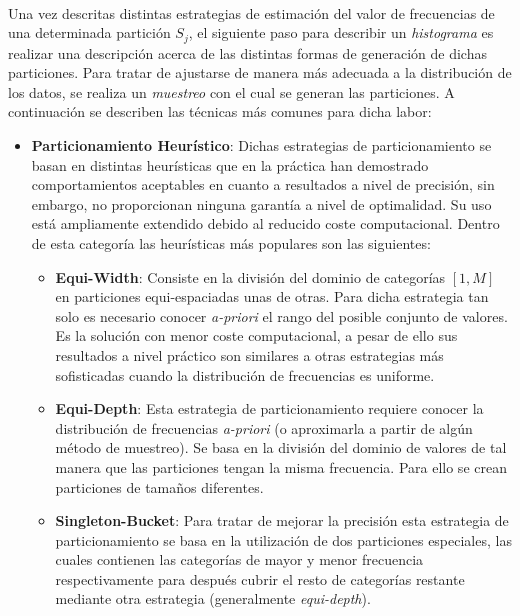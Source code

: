 \documentclass{subfiles}
\begin{document}
        \paragraph{}
        Una vez descritas distintas estrategias de estimación del valor de frecuencias de una determinada partición $S_j$, el siguiente paso para describir un \emph{histograma} es realizar una descripción acerca de las distintas formas de generación de dichas particiones. Para tratar de ajustarse de manera más adecuada a la distribución de los datos, se realiza un \emph{muestreo} con el cual se generan las particiones. A continuación se describen las técnicas más comunes para dicha labor:

        \begin{itemize}

          \item \textbf{Particionamiento Heurístico}: Dichas estrategias de particionamiento se basan en distintas heurísticas que en la práctica han demostrado comportamientos aceptables en cuanto a resultados a nivel de precisión, sin embargo, no proporcionan ninguna garantía a nivel de optimalidad. Su uso está ampliamente extendido debido al reducido coste computacional. Dentro de esta categoría las heurísticas más populares son las siguientes:
            \begin{itemize}

              \item \textbf{Equi-Width}: Consiste en la división del dominio de categorías $[1,M]$ en particiones equi-espaciadas unas de otras. Para dicha estrategia tan solo es necesario conocer \emph{a-priori} el rango del posible conjunto de valores. Es la solución con menor coste computacional, a pesar de ello sus resultados a nivel práctico son similares a otras estrategias más sofisticadas cuando la distribución de frecuencias es uniforme.

              \item \textbf{Equi-Depth}: Esta estrategia de particionamiento requiere conocer la distribución de frecuencias \emph{a-priori} (o aproximarla a partir de algún método de muestreo). Se basa en la división del dominio de valores de tal manera que las particiones tengan la misma frecuencia. Para ello se crean particiones de tamaños diferentes.

              \item \textbf{Singleton-Bucket}: Para tratar de mejorar la precisión esta estrategia de particionamiento se basa en la utilización de dos particiones especiales, las cuales contienen las categorías de mayor y menor frecuencia respectivamente para después cubrir el resto de categorías restante mediante otra estrategia (generalmente \emph{equi-depth}).


\end{itemize}
\end{itemize}
\end{document}
